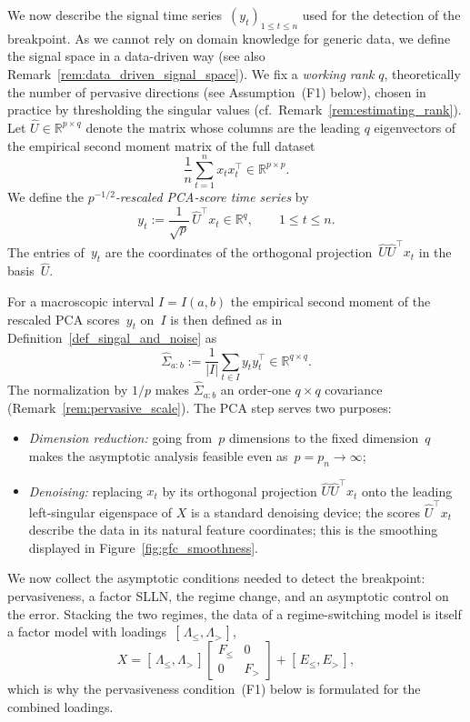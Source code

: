 \documentclass[10pt, letterpaper]{amsart}
\def\R{{\mathbb{R}}}
\begin{document}
We now describe the signal time series~$(y_t)_{1 \leq t \leq n}$ used for the detection of the breakpoint. As we cannot rely on domain knowledge for generic data, we define the signal space in a data-driven way (see also Remark~\ref{rem:data_driven_signal_space}). We fix a \emph{working rank} $q$, theoretically the number of pervasive directions (see Assumption~(F1) below), chosen in practice by thresholding the singular values (cf.\ Remark~\ref{rem:estimating_rank}). Let $\widehat U \in \R^{p\times q}$ denote the matrix whose columns are the leading $q$ eigenvectors of the empirical second moment matrix of the full dataset
\[
   \frac1n\sum_{t=1}^n x_t x_t^{\top}\in \R^{p\times p}.
\]
We define the  \emph{$p^{-1/2}$-rescaled PCA-score time series} by
\begin{equation}\label{eq:projected_signal_factor_section}
y_t:= \frac1{\sqrt p}\,\widehat U^{\top}x_t\in \R^q,\qquad 1\le t\le n.
\end{equation}
 The entries of~$y_t$ are the coordinates of the orthogonal projection~$\widehat U\widehat U^{\top}x_t$ in the basis~$\widehat U$.

For a macroscopic interval $I=I(a,b)$ the empirical second moment of  the rescaled PCA scores~$y_{t}$ on~$I$ is then defined as in Definition~\ref{def_singal_and_noise} as
\begin{equation}\label{eq:projected_block_moment_factor}
  \widehat \Sigma_{a:b} :=\frac1{|I|}\sum_{t\in I}y_ty_t^{\top} \in\R^{q\times q}.
\end{equation}
The normalization by $1/p$ makes $\widehat \Sigma_{a:b}$ an order-one $q\times q$ covariance (Remark~\ref{rem:pervasive_scale}).  The PCA step serves two purposes:
\begin{itemize}
    \item \emph{Dimension reduction:} going from~$p$ dimensions to the fixed dimension~$q$ makes the asymptotic analysis feasible even as~$p=p_n\to\infty$;
    \item \emph{Denoising:}  replacing $x_t$ by its orthogonal projection $\widehat U\widehat U^{\top}x_t$ onto the leading left-singular eigenspace of $X$ is a standard denoising device; the scores $\widehat U^{\top}x_t$ describe the data in its natural feature coordinates; this is the smoothing displayed in Figure~\ref{fig:gfc_smoothness}.
\end{itemize}

  

  

We now collect the asymptotic conditions needed to detect the breakpoint: pervasiveness, a factor SLLN, the regime change, and an asymptotic control on the error.  Stacking the two regimes, the data of a regime-switching model is itself a factor model with loadings~$[\,\Lambda_{\le}, \Lambda_{>}\,]$,
\[
X=[\,\Lambda_{\le}, \Lambda_{>}\,]\begin{bmatrix}F_{\le} & 0\\ 0 & F_{>}\end{bmatrix}+[\,E_{\le}, E_{>}\,],
\]
which is why the pervasiveness condition~(F1) below is formulated for the combined loadings.
\end{document}
